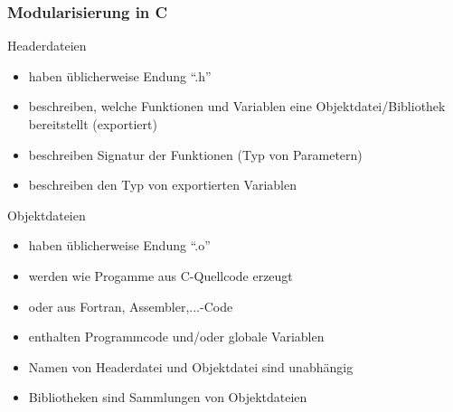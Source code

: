 \documentclass{slides}
\begin{document}
\begin{frame}
  \frametitle{Modularisierung in C}

  \begin{block}{Headerdateien}
    \vspace{-0.5\baselineskip}
    \begin{itemize}
    \item haben üblicherweise Endung "`.h"'
    \item beschreiben, welche Funktionen und Variablen eine Objektdatei/Bibliothek bereitstellt
      (\alert{exportiert})
    \item beschreiben \alert{Signatur} der Funktionen (Typ von Parametern)
    \item beschreiben den Typ von exportierten Variablen
    \end{itemize}
  \end{block}

  \begin{block}{Objektdateien}
    \vspace{-0.5\baselineskip}
    \begin{itemize}
    \item haben üblicherweise Endung "`.o"'
    \item werden wie Progamme aus C-Quellcode erzeugt
    \item oder aus Fortran, Assembler,...-Code
    \item enthalten Programmcode und/oder globale Variablen
    \end{itemize}
  \end{block}

  \begin{itemize}
  \item Namen von Headerdatei und Objektdatei sind unabhängig
  \item \alert{Bibliotheken} sind Sammlungen von Objektdateien
  \end{itemize}
\end{frame}
\end{document}
